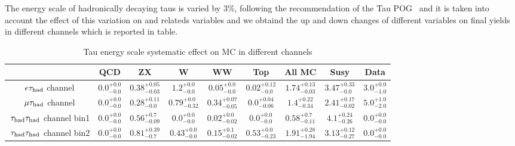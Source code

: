 The energy scale of hadronically decaying taus is varied by $3\%$, following the recommendation of the Tau POG~\cite{TauPOG} and it is taken into account the effect of this variation on \MET and \pt relateds variables and we obtaind the up and down changes of different variables on final yields in different channels which is reported in table.



\begin{table}[!h]
\tiny{
\begin{center}
\begin{tabular}{|c|c|c|c|c|c|c|c|c|}
\hline
                             & QCD & ZX    & W  & WW   & Top    & All MC & Susy & Data \\\hline 
$e\tau_{\rm had}$ channel           & $0.0 ^{+0.0} _{-0.0} $ & $0.38 ^{+0.05} _{-0.03}  $    &  $1.2 ^{+0.0} _{-0.0} $      &  $0.05 ^{+0.0} _{-0.0} $   &$0.02 ^{+0.12} _{-0.0} $           & $1.74 ^{+0.13} _{-0.03} $       & $3.47 ^{+0.33} _{-0.0} $ & $3.0 ^{+0.0} _{-1.0}$    \\\hline   

$\mu\tau_{\rm had}$ channel &  $0.0 ^{+0.0} _{-0.0} $     &  $0.28 ^{+0.11} _{-0.0} $      &  $0.79 ^{+0.0} _{-0.32} $  & $0.34 ^{+0.07} _{-0.05} $        &  $0.0 ^{+0.04} _{-0.06} $   &    $1.4 ^{+0.22} _{-0.34} $      &  $2.41 ^{+0.17} _{-0.02} $      & $5.0 ^{+1.0} _{-2.0} $     \\\hline  

$\,\tau_{\rm had}\tau_{\rm had}$ channel bin1 &  $0.0 ^{+0.0} _{-0.0}$   &    $0.56 ^{+0.7} _{-0.09}$    &  $0.0 ^{+0.0} _{-0.0}$      &  $0.02 ^{+0.0} _{-0.02}$        &   $0.0 ^{+0.0} _{-0.0}$        &    $0.58 ^{+0.7} _{-0.11}$     & $4.1^{+0.24} _{-0.26} $    & $0.0 ^{+0.0} _{-0.0}$\\\hline

$\,\tau_{\rm had}\tau_{\rm had}$ channel bin2 &  $0.0 ^{+0.0} _{-0.0}$   &     $0.81 ^{+0.39} _{-0.7}$     &    $0.43 ^{+0.0} _{-0.0}$     &     $0.15 ^{+0.1} _{-0.02}$     &   $0.53 ^{+0.0} _{-0.23}$   &      $1.91 ^{+0.28} _{-1.94}$     &     $3.13 ^{+0.12} _{-0.27}$   &  $0.0 ^{+0.0} _{-0.0}$    \\\hline
\end{tabular} 
\end{center}
\caption{Tau energy scale systematic effect on MC in different channels}
\label{Tab.susyHiggs}

}
\end{table}     

